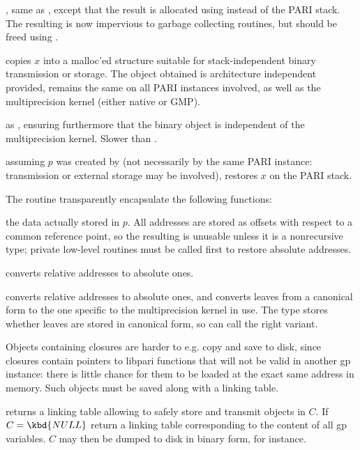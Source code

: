, same as , except
that the result is allocated using  instead of the PARI
stack. The resulting  is now impervious to garbage collecting
routines, but should be freed using .


 copies $x$ into a malloc'ed structure suitable
for stack-independent binary transmission or storage. The object obtained
is architecture independent provided,  remains the same
on all PARI instances involved, as well as the multiprecision kernel (either
native or GMP).

 as , ensuring furthermore
that the binary object is independent of the multiprecision kernel. Slower
than .

 assuming $p$ was created by 
(not necessarily by the same PARI instance: transmission or external storage
may be involved), restores $x$ on the PARI stack.

\noindent The routine  transparently encapsulate the following
functions:

 the  data actually stored in $p$.
All addresses are stored as offsets with respect to a common reference point,
so the resulting  is unusable unless it is a nonrecursive type;
private low-level routines must be called first to restore absolute addresses.

 converts relative addresses to
absolute ones.

 converts relative addresses to
absolute ones, and converts leaves from a canonical form to the one
specific to the multiprecision kernel in use. The  type stores
whether leaves are stored in canonical form, so  can call
the right variant.

\noindent Objects containing closures are harder to e.g. copy and save to disk,
since closures contain pointers to libpari functions that will not be valid in
another gp instance: there is little chance for them to be loaded at the exact
same address in memory. Such objects must be saved along with a linking table.

 returns a linking table allowing to safely
store and transmit  objects in $C$.  If $C = \kbd{NULL}$ return a
linking table corresponding to the content of all gp variables. $C$ may then be
dumped to disk in binary form, for instance.

